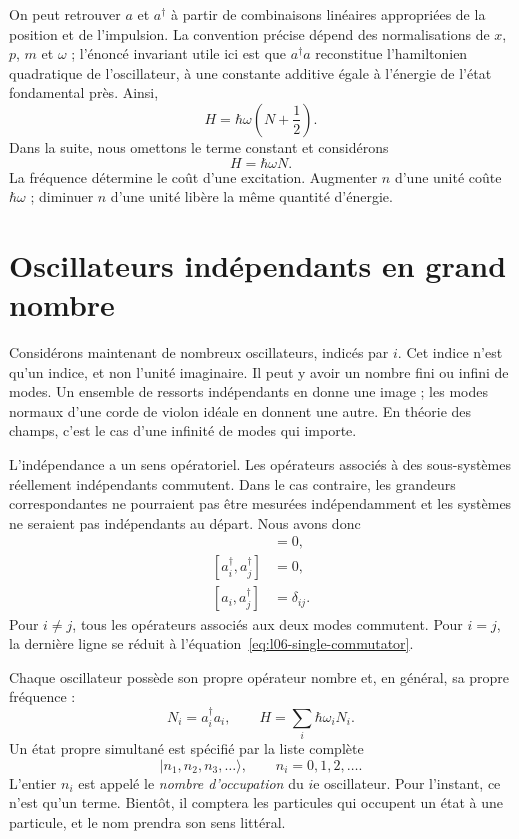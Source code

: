 On peut retrouver \(a\) et \(a^\dagger\) à partir de combinaisons linéaires appropriées de la position et de l’impulsion. La convention précise dépend des normalisations de \(x\), \(p\), \(m\) et \(\omega\) ; l’énoncé invariant utile ici est que \(a^\dagger a\) reconstitue l’hamiltonien quadratique de l’oscillateur, à une constante additive égale à l’énergie de l’état fondamental près. Ainsi,
\begin{equation}
H=\hbar\omega\left(N+\frac12\right).
\end{equation}
Dans la suite, nous omettons le terme constant et considérons
\begin{equation}
H=\hbar\omega N.
\label{eq:l06-one-oscillator-hamiltonian}
\end{equation}
La fréquence détermine le coût d’une excitation. Augmenter \(n\) d’une unité coûte \(\hbar\omega\) ; diminuer \(n\) d’une unité libère la même quantité d’énergie.

\section{Oscillateurs indépendants en grand nombre}

Considérons maintenant de nombreux oscillateurs, indicés par \(i\). Cet indice n’est qu’un indice, et non l’unité imaginaire. Il peut y avoir un nombre fini ou infini de modes. Un ensemble de ressorts indépendants en donne une image ; les modes normaux d’une corde de violon idéale en donnent une autre. En théorie des champs, c’est le cas d’une infinité de modes qui importe.

L’indépendance a un sens opératoriel. Les opérateurs associés à des sous-systèmes réellement indépendants commutent. Dans le cas contraire, les grandeurs correspondantes ne pourraient pas être mesurées indépendamment et les systèmes ne seraient pas indépendants au départ. Nous avons donc
\begin{align}
[a_i,a_j]&=0, \\
[a_i^\dagger,a_j^\dagger]&=0, \\
[a_i,a_j^\dagger]&=\delta_{ij}.
\label{eq:l06-many-commutators}
\end{align}
Pour \(i\ne j\), tous les opérateurs associés aux deux modes commutent. Pour \(i=j\), la dernière ligne se réduit à l’équation~\eqref{eq:l06-single-commutator}.

Chaque oscillateur possède son propre opérateur nombre et, en général, sa propre fréquence :
\begin{equation}
N_i=a_i^\dagger a_i,
\qquad
H=\sum_i\hbar\omega_i N_i.
\label{eq:l06-many-hamiltonian}
\end{equation}
Un état propre simultané est spécifié par la liste complète
\begin{equation}
|n_1,n_2,n_3,\ldots\rangle,
\qquad n_i=0,1,2,\ldots.
\label{eq:l06-occupation-ket}
\end{equation}
L’entier \(n_i\) est appelé le \emph{nombre d’occupation} du \(i\)e oscillateur. Pour l’instant, ce n’est qu’un terme. Bientôt, il comptera les particules qui occupent un état à une particule, et le nom prendra son sens littéral.

